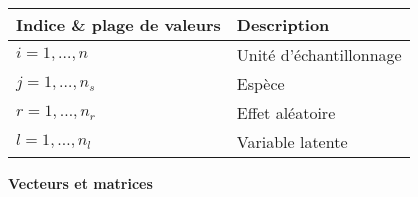 \begin{longtable}[l]{@{}ll@{}}
\toprule
\begin{minipage}[b]{0.39\columnwidth}\raggedright
Indice \& plage de valeurs\strut
\end{minipage} & \begin{minipage}[b]{0.39\columnwidth}\raggedright
Description\strut
\end{minipage}\tabularnewline
\midrule
\endhead
\begin{minipage}[t]{0.39\columnwidth}\raggedright
\(i = 1, \dots, n\)\strut
\end{minipage} & \begin{minipage}[t]{0.39\columnwidth}\raggedright
Unité d'échantillonnage\strut
\end{minipage}\tabularnewline
\begin{minipage}[t]{0.39\columnwidth}\raggedright
\(j = 1, \dots, n_s\)\strut
\end{minipage} & \begin{minipage}[t]{0.39\columnwidth}\raggedright
Espèce\strut
\end{minipage}\tabularnewline
\begin{minipage}[t]{0.39\columnwidth}\raggedright
\(r = 1, \dots, n_r\)\strut
\end{minipage} & \begin{minipage}[t]{0.39\columnwidth}\raggedright
Effet aléatoire\strut
\end{minipage}\tabularnewline
\begin{minipage}[t]{0.39\columnwidth}\raggedright
\(l = 1, \dots, n_l\)\strut
\end{minipage} & \begin{minipage}[t]{0.39\columnwidth}\raggedright
Variable latente\strut
\end{minipage}\tabularnewline
\bottomrule
\end{longtable}

\textbf{Vecteurs et matrices}

